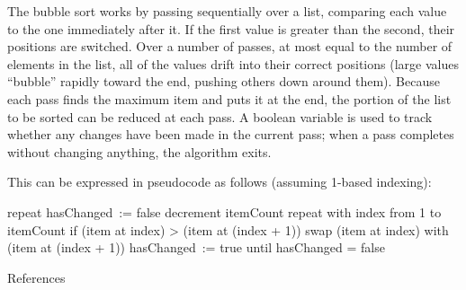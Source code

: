 The bubble sort works by passing sequentially over a list, comparing
each value to the one immediately after it. If the first value is
greater than the second, their positions are switched. Over a number of
passes, at most equal to the number of elements in the list, all of the
values drift into their correct positions (large values ``bubble''
rapidly toward the end, pushing others down around them). Because each
pass finds the maximum item and puts it at the end, the portion of the
list to be sorted can be reduced at each pass. A boolean variable is
used to track whether any changes have been made in the current pass;
when a pass completes without changing anything, the algorithm exits.

This can be expressed in pseudocode as follows (assuming 1-based
indexing):

\begin{wideverbatim}
repeat
    hasChanged := false
    decrement itemCount
    repeat with index from 1 to itemCount
        if (item at index) > (item at (index + 1))
            swap (item at index) with (item at (index + 1))
            hasChanged := true
until hasChanged = false
\end{wideverbatim}

\begin{description}
\item[References]
\end{description}

